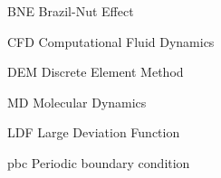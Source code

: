 
\begin{siglas}
    \item[BNE] Brazil-Nut Effect
    \item[CFD] Computational Fluid Dynamics
    \item[DEM] Discrete Element Method
    \item[MD] Molecular Dynamics
    \item[LDF] Large Deviation Function
    \item[pbc] Periodic boundary condition
\end{siglas}

